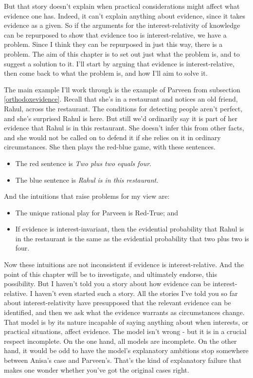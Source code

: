 \documentclass[11pt,]{book}
\providecommand{\tightlist}{%
  \setlength{\itemsep}{0pt}\setlength{\parskip}{0pt}}
\begin{document}
But that story doesn't explain when practical considerations might affect what evidence one has. Indeed, it can't explain anything about evidence, since it takes evidence as a given. So if the arguments for the interest-relativity of knowledge can be repurposed to show that evidence too is interest-relative, we have a problem. Since I think they can be repurposed in just this way, there is a problem. The aim of this chapter is to set out just what the problem is, and to suggest a solution to it. I'll start by arguing that evidence is interest-relative, then come back to what the problem is, and how I'll aim to solve it.

The main example I'll work through is the example of Parveen from subsection \ref{orthodoxevidence}. Recall that she's in a restaurant and notices an old friend, Rahul, across the restaurant. The conditions for detecting people aren't perfect, and she's surprised Rahul is here. But still we'd ordinarily say it is part of her evidence that Rahul is in this restaurant. She doesn't infer this from other facts, and she would not be called on to defend it if she relies on it in ordinary circumstances. She then plays the red-blue game, with these sentences.

\begin{itemize}
\tightlist
\item
  The red sentence is \emph{Two plus two equals four}.
\item
  The blue sentence is \emph{Rahul is in this restaurant}.
\end{itemize}

And the intuitions that raise problems for my view are:

\begin{itemize}
\tightlist
\item
  The unique rational play for Parveen is Red-True; and
\item
  If evidence is interest-invariant, then the evidential probability that Rahul is in the restaurant is the same as the evidential probability that two plus two is four.
\end{itemize}

Now these intuitions are not inconsistent if evidence is interest-relative. And the point of this chapter will be to investigate, and ultimately endorse, this possibility. But I haven't told you a story about how evidence can be interest-relative. I haven't even started such a story. All the stories I've told you so far about interest-relativity have presupposed that the relevant evidence can be identified, and then we ask what the evidence warrants as circumstances change. That model is by its nature incapable of saying anything about when interests, or practical situations, affect evidence. The model isn't wrong - but it is in a crucial respect incomplete. On the one hand, all models are incomplete. On the other hand, it would be odd to have the model's explanatory ambitions stop somewhere between Anisa's case and Parveen's. That's the kind of explanatory failure that makes one wonder whether you've got the original cases right.
\end{document}
